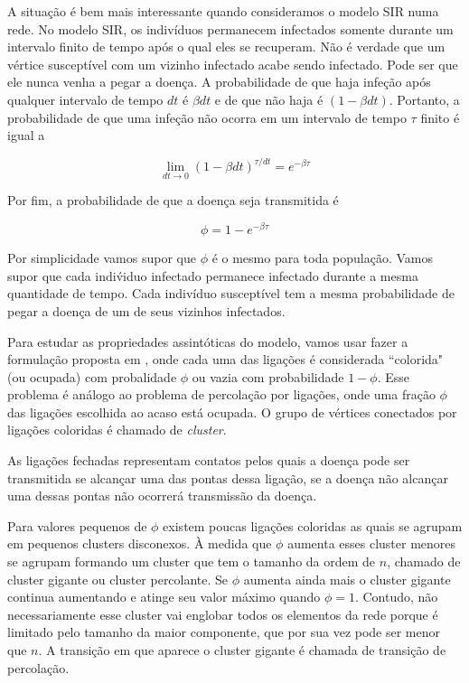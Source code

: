 \documentclass[a4paper,11pt]{report}
\begin{document}
A situa\c{c}\~ao \'e bem mais interessante quando consideramos o modelo SIR numa rede. No modelo SIR, os indiv\'iduos permanecem infectados somente durante um intervalo finito de tempo ap\'os o qual eles se recuperam. N\~ao \'e verdade que um v\'ertice suscept\'ivel com um vizinho infectado acabe sendo infectado. Pode ser que ele nunca venha a pegar a doen\c{c}a. A probabilidade de que haja infe\c{c}\~ao ap\'os qualquer intervalo de tempo $dt$ \'e $\beta dt$ e de que n\~ao haja \'e $(1-\beta dt)$. Portanto, a probabilidade de que uma infe\c{c}\~ao n\~ao ocorra em um intervalo de tempo $\tau$ finito \'e igual a 

\begin{equation}
\lim_{dt\to 0}(1-\beta dt)^{\tau/dt}=e^{-\beta\tau}
\end{equation}

Por fim, a probabilidade de que a doen\c{c}a seja transmitida \'e

\begin{equation}
\phi=1-e^{-\beta\tau}
\end{equation}

Por simplicidade vamos supor que $\phi$ \'e o mesmo para toda popula\c{c}\~ao. Vamos supor que cada indi\'viduo infectado permanece infectado durante a mesma quantidade de tempo. Cada indiv\'iduo suscept\'ivel tem a mesma probabilidade de pegar a doen\c{c}a de um de seus vizinhos infectados. 

Para estudar as propriedades assint\'oticas do modelo, vamos usar fazer a formula\c{c}\~ao proposta em \cite{Grassberger:1983tj}, onde cada uma das liga\c{c}\~oes \'e considerada ``colorida"$\;$ (ou ocupada) com probalidade $\phi$ ou vazia com probabilidade $1-\phi$. Esse problema \'e an\'alogo ao problema de percola\c{c}\~ao por liga\c{c}\~oes, onde uma fra\c{c}\~ao $\phi$ das liga\c{c}\~oes escolhida ao acaso est\'a ocupada. O grupo de v\'ertices conectados por liga\c{c}\~oes coloridas \'e chamado de \textit{cluster}.

As liga\c{c}\~oes fechadas representam contatos pelos quais a doen\c{c}a pode ser transmitida se alcan\c{c}ar uma das pontas dessa liga\c{c}\~ao, se a doen\c{c}a n\~ao alcan\c{c}ar uma dessas pontas n\~ao ocorrer\'a transmiss\~ao da doen\c{c}a. 

Para valores pequenos de $\phi$ existem poucas liga\c{c}\~oes coloridas as quais se agrupam em pequenos clusters disconexos. \`A medida que $\phi$ aumenta esses cluster menores se agrupam formando um cluster que tem o tamanho da ordem de $n$, chamado de cluster gigante ou cluster percolante. Se $\phi$ aumenta ainda mais o cluster gigante continua aumentando e atinge seu valor m\'aximo quando $\phi=1$. Contudo, n\~ao necessariamente esse cluster vai englobar todos os elementos da rede porque \'e limitado pelo tamanho da maior componente, que por sua vez pode ser menor que $n$. A transi\c{c}\~ao em que aparece o cluster gigante \'e chamada de transi\c{c}\~ao de percola\c{c}\~ao. 
\end{document}
